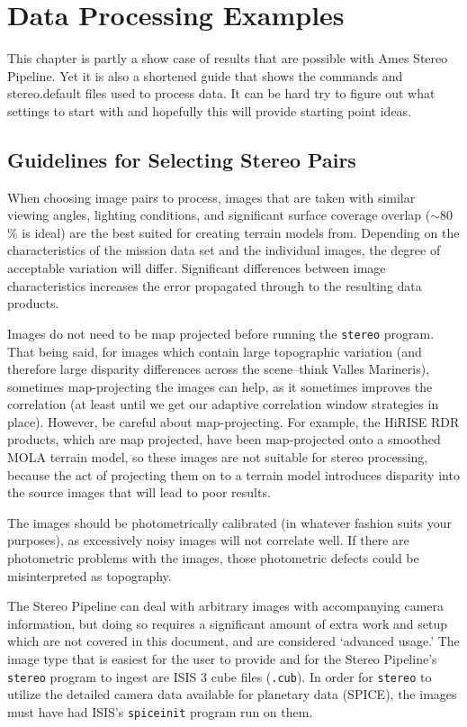 \chapter{Data Processing Examples}

This chapter is partly a show case of results that are possible with
Ames Stereo Pipeline. Yet it is also a shortened guide that shows the
commands and stereo.default files used to process data. It can be hard
try to figure out what settings to start with and hopefully this will
provide starting point ideas.

\section{Guidelines for Selecting Stereo Pairs}

When choosing image pairs to process, images that are taken with
similar viewing angles, lighting conditions, and significant surface
coverage overlap ($\sim80$\% is ideal) are the best suited for
creating terrain models from. Depending on the characteristics of
the mission data set and the individual images, the degree of
acceptable variation will differ. Significant differences between
image characteristics increases the error propagated through to the
resulting data products.

Images do not need to be map projected before running the \texttt{stereo}
program. That being said, for images which contain large topographic
variation (and therefore large disparity differences across the
scene--think Valles Marineris), sometimes map-projecting the images
can help, as it sometimes improves the correlation (at least until
we get our adaptive correlation window strategies in place).  However,
be careful about map-projecting.  For example, the HiRISE RDR
products, which are map projected, have been map-projected onto a
smoothed MOLA terrain model, so these images are not suitable for
stereo processing, because the act of projecting them on to a terrain
model introduces disparity into the source images that will lead
to poor results.

The images should be photometrically calibrated (in whatever fashion
suits your purposes), as excessively noisy images will not correlate
well.  If there are photometric problems with the images, those
photometric defects could be misinterpreted as topography.

The Stereo Pipeline can deal with arbitrary images with accompanying
camera information, but doing so requires a significant amount of
extra work and setup which are not covered in this document, and
are considered `advanced usage.'  The image type that is easiest
for the user to provide and for the Stereo Pipeline's \texttt{stereo}
program to ingest are ISIS 3 cube files (\texttt{.cub}).  In order
for \texttt{stereo} to utilize the detailed camera data available
for planetary data (SPICE), the images must have had ISIS's
\texttt{spiceinit} program run on them.

